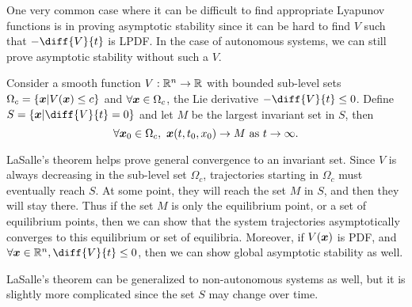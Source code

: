 One very common case where it can be difficult to find appropriate Lyapunov
functions is in proving asymptotic stability since it can be hard to find $V$
such that $-\diff{V}{t}$ is LPDF. In the case of autonomous systems, we can
still prove asymptotic stability without such a $V$.
\begin{theorem}
	Consider a smooth function $V:\mathbb{R}^n\to\mathbb{R}$ with bounded sub-level sets $\Omega_c
	= \left\{\boldsymbol{x} | V(\boldsymbol{x}) \leq c \right\}$ and $\forall \boldsymbol{x}\in \Omega_c$, the Lie
	derivative $-\diff{V}{t} \leq 0$. Define $S = \left\{\bs{x}|\diff{V}{t} = 0\right\}$ and let
		$M$ be the largest invariant set in $S$, then \[
			\forall \bs{x}_0\in \Omega_c,\ \bs{x}(t, t_0, x_0) \to M \text{ as } t\to
			\infty.
		\]
	\label{thm:la-salles}
\end{theorem}
LaSalle's theorem helps prove general convergence to an invariant set. Since $V$
is always decreasing in the sub-level set $\Omega_c$, trajectories starting in
$\Omega_c$ must eventually reach $S$. At some point, they will reach the set $M$
in $S$, and then they will stay there. Thus if the set $M$ is only the
equilibrium point, or a set of equilibrium points, then we can show that the
system trajectories asymptotically converges to this equilibrium or set of
equilibria. Moreover, if $V(\boldsymbol{x})$ is PDF, and $\forall \bs{x}\in\mathbb{R}^n,
\diff{V}{t} \leq 0$, then we can show global asymptotic stability as well.

LaSalle's theorem can be generalized to non-autonomous systems as well, but it
is slightly more complicated since the set $S$ may change over time.

